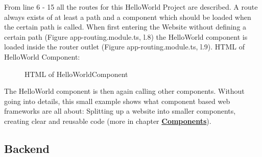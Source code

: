 From line 6 - 15 all the routes for this HelloWorld Project are described.
A route always exists of at least a path and a component which should be loaded when the certain path is called.
When first entering the Website without defining a certain path (Figure app-routing.module.ts, l.8) the HelloWorld
component is loaded inside the router outlet (Figure app-routing.module.ts, l.9).
HTML of HelloWorld Component:

\begin{figure}[H]
    \centering
    \caption{HTML of HelloWorldComponent}
    \label{fig:htmlhello}
\end{figure}

The HelloWorld component is then again calling other components.
Without going into details, this small example shows what component based web frameworks are all about: Splitting up a
website into smaller components, creating clear and reusable code
(more in chapter \hyperref[subsec:components]{\textbf{Components}}).

\subsection{Backend}\label{subsec:backend}

